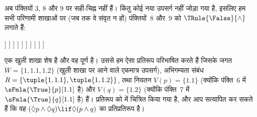 \documentclass[../../../include/open-logic-section]{subfiles}
\begin{document}
{\begin{ex}
  अब पंक्तियों 3, 8 और 9 पर सही-चिह्न नहीं हैं। किंतु कोई नया उपसर्ग नहीं
  जोड़ा गया है, इसलिए हम सभी परिणामी शाखाओं पर (जब तक वे संवृत न हों)
  पंक्तियों~8 और~9 को $\TRule{\False}{\land}$ लगाते हैं:
  \begin{oltableau}
    [\pFmla{\False}{(\Diamond p \land \Diamond q) \lif \Diamond(p \land q)}{1},
      just = \TAss, checked
      [\pFmla{\True}{\Diamond p \land \Diamond q}{1},
        just = {\TRule{\False}{\lif}[1]}, checked
        [\pFmla{\False}{\Diamond(p \land q)}{1},
          just = {\TRule{\False}{\lif}[1]}
          [\pFmla{\True}{\Diamond p}{1},
            just = {\TRule{\True}{\land}[2]}, checked
            [\pFmla{\True}{\Diamond q}{1},
              just = {\TRule{\True}{\land}[2]}, checked
              [\pFmla{\True}{p}{1.1}, 
                just = {\TRule{\True}{\Diamond}[4]}, checked
                [\pFmla{\True}{q}{1.2}, 
                  just = {\TRule{\True}{\Diamond}[5]}, checked
                  [\pFmla{\False}{p \land q}{1.1}, 
                    just = {\TRule{\False}{\Diamond}[3]}, checked
                    [\pFmla{\False}{p \land q}{1.2}, 
                      just = {\TRule{\False}{\Diamond}[3]}, checked
                      [\pFmla{\False}{p}{1.1},
                        just = {\TRule{\False}{\land}[8]}, checked, close
                      ]
                      [\pFmla{\False}{q}{1.1},
                        just = {\TRule{\False}{\land}[8]}, checked
                        [\pFmla{\False}{p}{1.2},
                          just = {\TRule{\False}{\land}[9]}, checked]
                        [\pFmla{\False}{q}{1.2},
                          just = {\TRule{\False}{\land}[9]}, checked, close]
                      ]
                    ]
                  ]
                ]
              ]
            ]
          ]
        ]
      ]
    ]
  \end{oltableau}
  एक खुली शाखा शेष है और वह पूर्ण है। उससे हम ऐसा प्रतिरूप परिभाषित करते
  हैं जिसके जगत $W = \{1, 1.1, 1.2\}$ (खुली शाखा पर आने वाले एकमात्र
  उपसर्ग), अभिगम्यता संबंध $R = \{\tuple{1, 1.1}, \tuple{1, 1.2}\}$,
  तथा नियतन $V(p) = \{1.1\}$ (क्योंकि पंक्ति~6 में
  $\sFmla{\True}{p}[1.1]$ है) और $V(q) = \{1.2\}$ (क्योंकि पंक्ति~7
  में $\sFmla{\True}{q}[1.1]$ है) हैं। प्रतिरूप को
   में चित्रित किया गया है, और आप सत्यापित कर
  सकते हैं कि वह $(\Diamond p \land \Diamond q) \lif \Diamond (p \land
  q)$ का प्रतिप्रतिरूप है।
  \begin{figure}
  \begin{center}
    \begin{tikzpicture}[modal]

\end{tikzpicture}
\end{center}
\end{figure}
\end{ex}}
\end{document}
